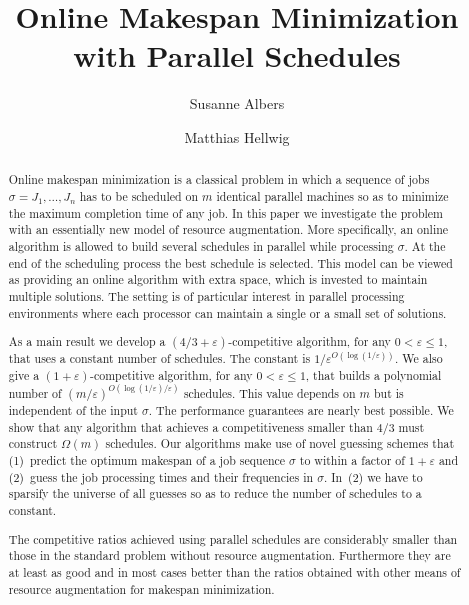 \documentclass{llncs}
\newcommand{\eps}{\varepsilon}
\begin{document}
\title{Online Makespan Minimization with Parallel Schedules\vspace*{-0.3cm}}
\author{Susanne Albers \and Matthias Hellwig}

\maketitle

\begin{abstract}

Online makespan minimization is a classical problem in which a sequence of jobs $\sigma = J_1, \ldots, J_n$
has to be scheduled on $m$ identical parallel machines so as to minimize the maximum completion time of any job.
In this paper we investigate the problem with an essentially new model of resource augmentation.
More specifically, an online algorithm is allowed to build several schedules in parallel while processing $\sigma$. 
At the end of the scheduling process the best schedule is selected. This model can be viewed as 
providing an online algorithm with extra space, which is invested to maintain multiple solutions. The 
setting is of particular interest in parallel processing environments where each processor can maintain a 
single or a small set of solutions. 

As a main result we develop a $(4/3+\eps)$-competitive algorithm, for any $0<\eps\leq 1$, that uses a 
constant number of schedules. The constant is $1/\eps^{O(\log (1/\eps))}$. We also give 
a $(1+\eps)$-competitive algorithm, 
for any $0<\eps\leq 1$, that builds a polynomial number of $(m/\eps)^{O(\log (1/\eps) / \eps)}$ 
schedules. This value depends on $m$ but is independent of the input $\sigma$. The performance guarantees
are nearly best possible. We show that any algorithm that achieves a competitiveness smaller than $4/3$
must construct $\Omega(m)$ schedules. Our algorithms make use of novel guessing schemes that (1)~predict
the optimum makespan of a job sequence $\sigma$ to within a factor of $1+\eps$ and (2)~guess the job processing 
times and their frequencies in $\sigma$. In~(2) we have to sparsify the universe of all guesses so
as to reduce the number of schedules to a constant.

The competitive ratios achieved using parallel schedules are considerably smaller than
those in the standard problem without resource augmentation. Furthermore they are at least as good and
in most cases better than the ratios obtained with other means of resource augmentation for makespan
minimization.

\end{abstract}
\end{document}
